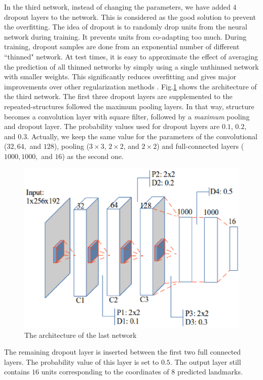 \documentclass[conference]{IEEEtran}
\begin{document}
In the third network, instead of changing the parameters, we have added $4$ dropout layers to the network. This is considered as the good solution to prevent the overfitting. The idea of dropout is to randomly drop units from the neural network during training. It prevents units from co-adapting too much. During training, dropout samples are done from an exponential number of different ``thinned" network. At test times, it is easy to approximate the effect of averaging the prediction of all thinned networks by simply using a single unthinned network with smaller weights. This significantly reduces overfitting and gives major improvements over other regularization methods \cite{srivastava2014dropout}. Fig.\ref{figarch} shows the architecture of the third network. The first three dropout layers are supplemented to the repeated-structures followed the maximum pooling layers. In that way, structure becomes a convolution layer with square filter, followed by a \textit{maximum} pooling and dropout layer. The probability values used for dropout layers are $0.1$, $0.2$, and $0.3$. Actually, we keep the same value for the parameters of the convolutional ($32, 64,$ and $128$), pooling ($3 \times 3$, $2 \times 2$, and $2 \times 2$) and full-connected layers ($1000, 1000,$ and $16$) as the second one.

\begin{figure}[htbp]
	\centerline{\includegraphics[scale=0.47]{images/architecture3.eps}}
	\caption{The architecture of the last network}
	\label{figarch}
\end{figure}

The remaining dropout layer is inserted between the first two full connected layers. The probability value of this layer is set to $0.5$. The output layer still contains $16$ units corresponding to the coordinates of $8$ predicted landmarks.
\end{document}
